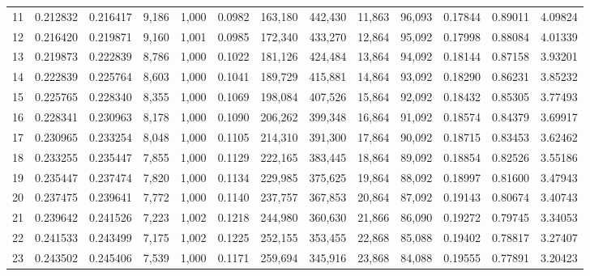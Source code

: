 \begin{tabular}{rrrrrrrrrrrrr}
11  &  0.212832 &  0.216417 &   9,186 &  1,000 &                                     0.0982 &  163,180 &  442,430 &   11,863 &   96,093 &  0.17844 &  0.89011 &  4.09824 \\
12  &  0.216420 &  0.219871 &   9,160 &  1,001 &                                     0.0985 &  172,340 &  433,270 &   12,864 &   95,092 &  0.17998 &  0.88084 &  4.01339 \\
13  &  0.219873 &  0.222839 &   8,786 &  1,000 &                                     0.1022 &  181,126 &  424,484 &   13,864 &   94,092 &  0.18144 &  0.87158 &  3.93201 \\
14  &  0.222839 &  0.225764 &   8,603 &  1,000 &                                     0.1041 &  189,729 &  415,881 &   14,864 &   93,092 &  0.18290 &  0.86231 &  3.85232 \\
15  &  0.225765 &  0.228340 &   8,355 &  1,000 &                                     0.1069 &  198,084 &  407,526 &   15,864 &   92,092 &  0.18432 &  0.85305 &  3.77493 \\
16  &  0.228341 &  0.230963 &   8,178 &  1,000 &                                     0.1090 &  206,262 &  399,348 &   16,864 &   91,092 &  0.18574 &  0.84379 &  3.69917 \\
17  &  0.230965 &  0.233254 &   8,048 &  1,000 &                                     0.1105 &  214,310 &  391,300 &   17,864 &   90,092 &  0.18715 &  0.83453 &  3.62462 \\
18  &  0.233255 &  0.235447 &   7,855 &  1,000 &                                     0.1129 &  222,165 &  383,445 &   18,864 &   89,092 &  0.18854 &  0.82526 &  3.55186 \\
19  &  0.235447 &  0.237474 &   7,820 &  1,000 &                                     0.1134 &  229,985 &  375,625 &   19,864 &   88,092 &  0.18997 &  0.81600 &  3.47943 \\
20  &  0.237475 &  0.239641 &   7,772 &  1,000 &                                     0.1140 &  237,757 &  367,853 &   20,864 &   87,092 &  0.19143 &  0.80674 &  3.40743 \\
21  &  0.239642 &  0.241526 &   7,223 &  1,002 &                                     0.1218 &  244,980 &  360,630 &   21,866 &   86,090 &  0.19272 &  0.79745 &  3.34053 \\
22  &  0.241533 &  0.243499 &   7,175 &  1,002 &                                     0.1225 &  252,155 &  353,455 &   22,868 &   85,088 &  0.19402 &  0.78817 &  3.27407 \\
23  &  0.243502 &  0.245406 &   7,539 &  1,000 &                                     0.1171 &  259,694 &  345,916 &   23,868 &   84,088 &  0.19555 &  0.77891 &  3.20423 \\

\end{tabular}
